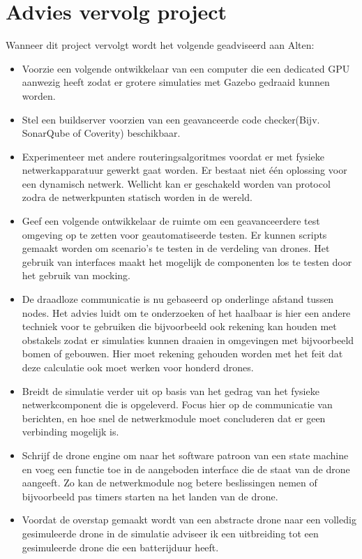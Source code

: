 \documentclass[a4paper, 11pt, oneside]{report}
\begin{document}
\section{Advies vervolg project}\label{sec:advies-vervolg-project}
Wanneer dit project vervolgt wordt het volgende geadviseerd aan Alten:
\begin{itemize}
	\item Voorzie een volgende ontwikkelaar van een computer die een dedicated GPU aanwezig heeft zodat er grotere simulaties met Gazebo gedraaid kunnen worden.
	
	\item Stel een buildserver voorzien van een geavanceerde code checker(Bijv. SonarQube of Coverity) beschikbaar.
	 
	\item Experimenteer met andere routeringsalgoritmes voordat er met fysieke netwerkapparatuur gewerkt gaat worden. Er bestaat niet één oplossing voor een dynamisch netwerk. Wellicht kan er geschakeld worden van protocol zodra de netwerkpunten statisch worden in de wereld.  
	
	\item Geef een volgende ontwikkelaar de ruimte om een geavanceerdere test omgeving op te zetten voor geautomatiseerde testen.
	Er kunnen scripts gemaakt worden om scenario's te testen in de verdeling van drones. Het gebruik van interfaces maakt het mogelijk de componenten los te testen door het gebruik van mocking.
	
	\item De draadloze communicatie is nu gebaseerd op onderlinge afstand tussen nodes. Het advies luidt om te onderzoeken of het haalbaar is hier een andere techniek voor te gebruiken die bijvoorbeeld ook rekening kan houden met obstakels zodat er simulaties kunnen draaien in omgevingen met bijvoorbeeld bomen of gebouwen. Hier moet rekening gehouden worden met het feit dat deze calculatie ook moet werken voor honderd drones.
	
	\item Breidt de simulatie verder uit op basis van het gedrag van het fysieke netwerkcomponent die is opgeleverd. Focus hier op de communicatie van berichten, en hoe snel de netwerkmodule moet concluderen dat er geen verbinding mogelijk is.
	
	\item Schrijf de drone engine om naar het software patroon van een state machine en voeg een functie toe in de aangeboden interface die de staat van de drone aangeeft. Zo kan de netwerkmodule nog betere beslissingen nemen of bijvoorbeeld pas timers starten na het landen van de drone.
	
	\item Voordat de overstap gemaakt wordt van een abstracte drone naar een volledig gesimuleerde drone in de simulatie adviseer ik een uitbreiding tot een gesimuleerde drone die een batterijduur heeft.
	
\end{itemize}
\end{document}
